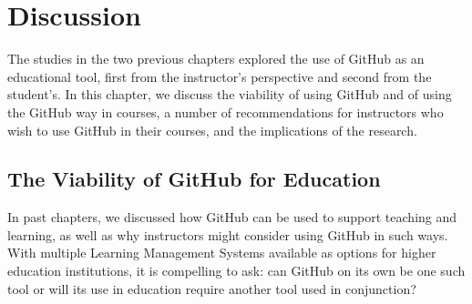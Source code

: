 \chapter{Discussion}
The studies in the two previous chapters explored the use of GitHub as an educational tool, first from the instructor's perspective and second from the student's. In this chapter, we discuss the viability of using GitHub and of using the GitHub way in courses, a number of recommendations for instructors who wish to use GitHub in their courses, and the implications of the research.

\section{The Viability of GitHub for Education}
In past chapters, we discussed how GitHub can be used to support teaching and learning, as well as why instructors might consider using GitHub in such ways. With multiple Learning Management Systems available as options for higher education institutions, it is compelling to ask: can GitHub on its own be one such tool or will its use in education require another tool used in conjunction?


